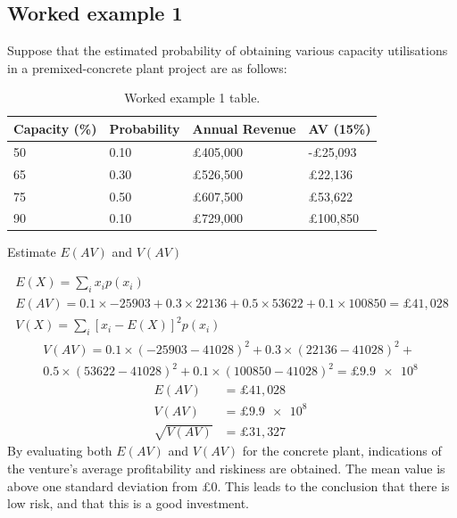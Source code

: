 \subsection{Worked example 1}
Suppose that the estimated probability of obtaining various capacity utilisations in a premixed-concrete plant project are as follows:
\begin{table}[H]
    \centering
    \begin{tabular}{@{}llll@{}}
        \toprule
        \textbf{Capacity (\%)} & \textbf{Probability} & \textbf{Annual Revenue} & \textbf{AV (15\%)} \\
        \midrule
        50                     & 0.10                 & \pounds 405,000         & -\pounds 25,093    \\
        65                     & 0.30                 & \pounds 526,500         & \pounds 22,136     \\
        75                     & 0.50                 & \pounds 607,500         & \pounds 53,622     \\
        90                     & 0.10                 & \pounds 729,000         & \pounds 100,850    \\
        \bottomrule
    \end{tabular}
    \caption{Worked example 1 table.}
\end{table}
\begin{quoting}
    Estimate $E\left(AV\right)$ and $V\left(AV\right)$
\end{quoting}
\begin{gather}
    E\left(X\right) = \sum_i x_i p\left(x_i\right)\\
    E\left(AV\right) = 0.1 \times -25903 + 0.3 \times 22136 + 0.5 \times 53622 + 0.1 \times 100850 = \pounds 41,028\\
    V\left(X\right) = \sum_i \left[x_i - E\left(X\right)\right]^2 p\left(x_i\right)
\end{gather}
\begin{multline}
    V\left(AV\right) = 0.1 \times \left(-25903 - 41028\right)^2 + 0.3 \times \left(22136 - 41028\right)^2 + \\
    0.5 \times \left(53622 - 41028\right)^2 + 0.1 \times \left(100850 - 41028\right)^2 = \pounds\SI{9.9e8}{}
\end{multline}
\begin{align}
    E\left(AV\right)        & = \pounds 41,028       \\
    V\left(AV\right)        & = \pounds \SI{9.9e8}{} \\
    \sqrt{V\left(AV\right)} & = \pounds 31,327
\end{align}
By evaluating both $E\left(AV\right)$ and $V\left(AV\right)$ for the concrete plant, indications of the venture's average profitability and riskiness are obtained. The mean value is above one standard deviation from \pounds 0. This leads to the conclusion that there is low risk, and that this is a good investment.
